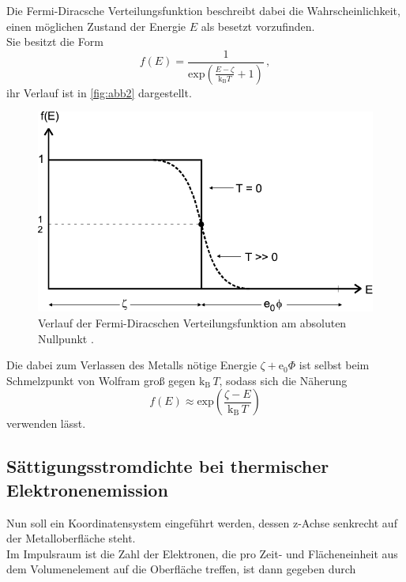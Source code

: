 Die Fermi-Diracsche Verteilungsfunktion beschreibt dabei die Wahrscheinlichkeit,
einen möglichen Zustand der Energie $E$ als besetzt vorzufinden. \\
Sie besitzt die Form
\begin{equation*}
    f(E) = \dfrac{1}{\text{exp}\left(\frac{E - \zeta}{\text{k}_\text{B} T} + 1 \right)} \,,
\end{equation*}
ihr Verlauf ist in \autoref{fig:abb2} dargestellt.

\begin{figure}[H]
    \centering
    \includegraphics{figures/Abb2.pdf}
    \caption{Verlauf der Fermi-Diracschen Verteilungsfunktion am absoluten Nullpunkt \cite{ap09}.}
    \label{fig:abb2}
\end{figure}

Die dabei zum Verlassen des Metalls nötige Energie $\zeta + \text{e}_0 \Phi$
ist selbst beim Schmelzpunkt von Wolfram groß gegen $\text{k}_\text{B} \,T$,
sodass sich die Näherung
\begin{equation}
    f(E) \approx \text{exp}\left(\dfrac{\zeta - E}{\text{k}_\text{B} \, T} \right)
    \label{eq:approxfermidirac}
\end{equation}
verwenden lässt.


\subsection{Sättigungsstromdichte bei thermischer Elektronenemission}

Nun soll ein Koordinatensystem eingeführt werden, dessen z-Achse
senkrecht auf der Metalloberfläche steht. \\

Im Impulsraum ist die Zahl der Elektronen, die pro Zeit- und Flächeneinheit aus dem Volumenelement
auf die Oberfläche treffen, ist dann gegeben durch

